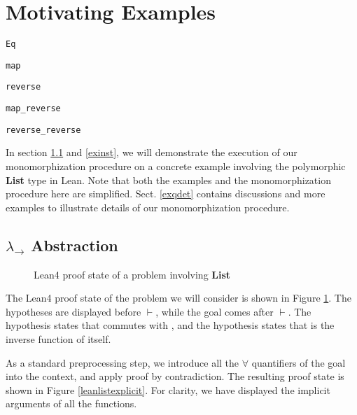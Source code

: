 \section{Motivating Examples} \label{motex}

\begin{lrbox}{\vEq} {\color{hypcolor} \verb|Eq|} \end{lrbox}
\begin{lrbox}{\vmap} {\color{hypcolor} \verb|map|} \end{lrbox}
\begin{lrbox}{\vrev} {\color{hypcolor} \verb|reverse|} \end{lrbox}
\begin{lrbox}{\vmaprev} {\color{hypcolor} \verb|map_reverse|} \end{lrbox}
\begin{lrbox}{\vrevrev} {\color{hypcolor} \verb|reverse_reverse|} \end{lrbox}

In section \ref{exabst} and \ref{exinst}, we will demonstrate the execution of our monomorphization procedure on a
concrete example involving the polymorphic \textbf{List} type in Lean. Note that both
the examples and the monomorphization procedure here are simplified. Sect. \ref{exqdet} contains
discussions and more examples to illustrate details of our monomorphization procedure.

\subsection{$\lambda_\to$ Abstraction} \label{exabst}

\begin{figure}
  \begin{CenteredBox}
    
  \end{CenteredBox}
  \caption{Lean4 proof state of a problem involving \textbf{List}} \label{leanlistpretty}
\end{figure}

The Lean4 proof state of the problem we will consider is shown in Figure \ref{leanlistpretty}.
The hypotheses are displayed before $\vdash$, while the goal comes after $\vdash$. The hypothesis
\usebox{\vmaprev} states that \usebox{\vmap} commutes with \usebox{\vrev}, and the hypothesis
\usebox{\vrevrev} states that \usebox{\vrev} is the inverse function of itself.

As a standard preprocessing step, we introduce all the $\forall$ quantifiers
of the goal into the context, and apply proof by contradiction. The resulting proof state
is shown in Figure \ref{leanlistexplicit}.
For clarity, we have displayed the implicit arguments of all the functions.

